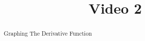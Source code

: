 \documentclass[handout]{ximera}
\title{Video 2}
\begin{document}
\begin{abstract}
Graphing The Derivative Function
\end{abstract}

\maketitle

\end{document}
